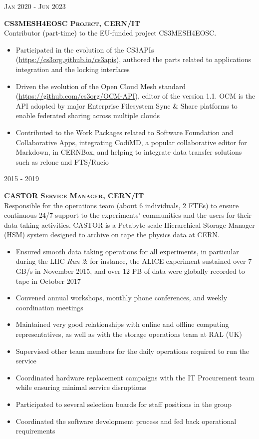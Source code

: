 \documentclass[11pt]{article}
\renewcommand{\subsection}[2]%
        {
         {\bf{\raggedright \scshape #1}}{\bf{\hfill \scshape #2}}\\[-.7\baselineskip]
}
\newenvironment{CompactItemize} {
  \begin{itemize}
  \setlength{\itemsep}{-3pt}
  \setlength{\parsep}{0pt}
  \setlength{\topsep}{-2pt}
  \setlength{\partopsep}{-2pt}
} {\end{itemize}}
\begin{document}
\subsection{Jan 2020 - Jun 2023}{CS3MESH4EOSC Project, CERN/IT}

Contributor (part-time) to the EU-funded project CS3MESH4EOSC.

\begin{CompactItemize}
\item Participated in the evolution of the CS3APIs (\href{https://cs3org.github.io/cs3apis}{https://cs3org.github.io/cs3apis}), authored the parts related to applications integration and the locking interfaces
\item Driven the evolution of the Open Cloud Mesh standard (\href{https://github.com/cs3org/OCM-API}{https://github.com/cs3org/OCM-API}), editor of the version 1.1. OCM is the API adopted by major Enterprise Filesystem Sync \& Share platforms to enable federated sharing across multiple clouds
\item Contributed to the Work Packages related to Software Foundation and Collaborative Apps, integrating CodiMD, a popular collaborative editor for Markdown, in CERNBox, and helping to integrate data transfer solutions such as rclone and FTS/Rucio
\end{CompactItemize}

\subsection{2015 - 2019}{CASTOR Service Manager, CERN/IT}

Responsible for the operations team (about 6 individuals, 2 FTEs) to ensure continuous 24/7 support to the experiments' communities and the users for their data taking activities.
CASTOR is a Petabyte-scale Hierarchical Storage Manager (HSM) system designed to archive on tape the physics data at CERN.

\begin{CompactItemize}
\item Ensured smooth data taking operations for all experiments, in particular during the LHC \emph{Run 2}: for instance, the ALICE experiment sustained over 7 GB/s in November 2015, and over 12 PB of data were globally recorded to tape in October 2017
\item Convened annual workshops, monthly phone conferences, and weekly coordination meetings
\item Maintained very good relationships with online and offline computing representatives, as well as with the storage operations team at RAL (UK)
\item Supervised other team members for the daily operations required to run the service
\item Coordinated hardware replacement campaigns with the IT Procurement team while ensuring minimal service disruptions
\item Participated to several selection boards for staff positions in the group
\item Coordinated the software development process and fed back operational requirements
\end{CompactItemize}
\end{document}
